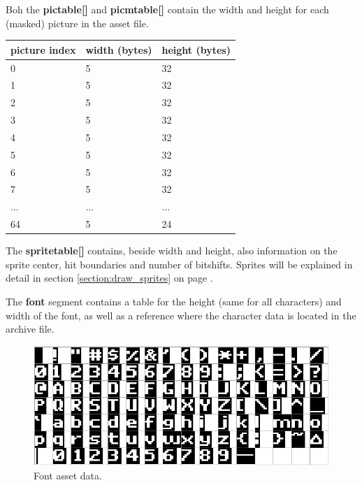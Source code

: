 \documentclass[book.tex]{subfiles}
\begin{document}
Boh the \textbf{pictable[]} and \textbf{picmtable[]} contain the width and height for each (masked) picture in the asset file.\\

  \begin{table}[H]
  \begin{tabularx}{0.8\textwidth}[c]{XXX}
  \hline
  \textbf{picture index} & \textbf{width (bytes)} & \textbf{height (bytes)}   \\ \hline
  0             & 5          & 32    \\
  1             & 5          & 32    \\
  2             & 5          & 32    \\
  3             & 5          & 32    \\
  4             & 5          & 32    \\
  5             & 5          & 32    \\
  6             & 5          & 32    \\
  7             & 5          & 32    \\
  ...             & ...          & ...    \\
  64             & 5          & 24    \\
  \end{tabularx}
  \end{table}



The \textbf{spritetable[]} contains, beside width and height, also information on the sprite center, hit boundaries and number of bitshifts. Sprites will be explained in detail in section \ref{section:draw_sprites} on page \pageref{section:draw_sprites}. \\

\par
\begin{minipage}{\textwidth}
 \par
 \end{minipage}

\par
The \textbf{font} segment contains a table for the height (same for all characters) and width of the font, as well as a reference where the character data is located in the archive file.\\

\begin{figure}[H] 
  \centering 
  \includegraphics[width=1.0\textwidth]{imgs/drawings/font.eps}
  \caption{Font asset data.}
  \label{fig:font_assets}
\end{figure} 
\end{document}
